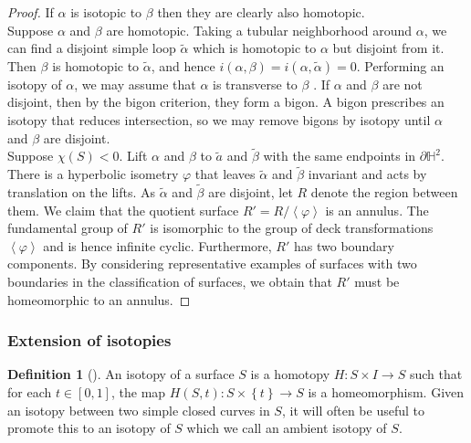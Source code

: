 \documentclass[reqno]{amsart}
\theoremstyle{definition}
\newtheorem{definition}[theorem]{Definition}
\theoremstyle{remark}
\begin{document}
\begin{proof}
    If $\alpha$ is isotopic to $\beta$ then they are clearly also
    homotopic.\\
    \linebreak
    Suppose $\alpha$ and $\beta$ are homotopic. Taking a
    tubular neighborhood around $\alpha$, we can find
    a disjoint simple loop $\tilde{\alpha}$ which is homotopic to
    $\alpha$ but disjoint from it. Then $\beta$ is homotopic
    to $\tilde{\alpha}$, and hence
    $i \left( \alpha, \beta \right) 
    = i \left( \alpha, \tilde{\alpha} \right) = 0$.
    Performing an isotopy of $\alpha$, we may assume that
    $\alpha$ is transverse to $\beta$ .
    If $\alpha$ and $\beta$ are not disjoint, then by
    the bigon criterion, they form a bigon. A bigon
    prescribes an isotopy that reduces intersection, so we
    may remove bigons by isotopy until $\alpha$ and $\beta$ are
    disjoint.\\
    \linebreak
    Suppose $\chi (S) <0$. Lift $\alpha$ and $\beta$ to
    $\tilde{a}$ and $\tilde{\beta}$ with the
    same endpoints in $\partial \mathbb{H}^2$. There
    is a hyperbolic isometry $\varphi$ that leaves
    $\tilde{\alpha}$ and $\tilde{\beta}$ invariant and
    acts by translation on the lifts. As $\tilde{\alpha}$ and
    $\tilde{\beta}$ are disjoint, let $R$ denote the region
    between them. We claim that the quotient surface
    $R' = R / \left<\varphi \right>$ is an annulus.
    The fundamental group of $R'$ is isomorphic to the group of
    deck transformations $\left<\varphi \right>$ and is hence
    infinite cyclic. Furthermore, $R'$ has two boundary components.
    By considering representative examples of surfaces
    with two boundaries in the classification of surfaces,
    we obtain that $R'$ must be homeomorphic to an annulus.
\end{proof}


\subsubsection{Extension of isotopies}

\begin{definition}[]
    An isotopy of a surface $S$ is a homotopy $H \colon 
    S \times I \to S$ such that for each
    $t \in \left[ 0,1 \right] $, the map
    $H \left( S, t \right) \colon S \times \left\{ t \right\} \to 
    S$ is a homeomorphism. Given an isotopy between
    two simple closed curves in $S$, it will often be useful
    to promote this to an isotopy of $S$ which we call an
    ambient isotopy of $S$.
\end{definition}
\end{document}
